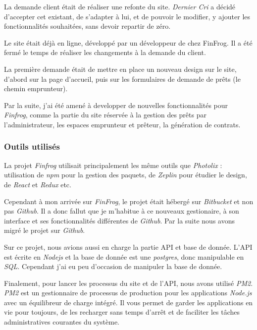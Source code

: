 \documentclass[12pt,a4paper]{article}
\begin{document}
  \bigskip
  La demande client était de réaliser une refonte du site. \emph{Dernier
  Cri} a décidé d'accepter cet existant, de s'adapter à lui, et de pouvoir
  le modifier, y ajouter les fonctionnalités souhaitées, sans devoir
  repartir de zéro.

  \bigskip

  Le site était déjà en ligne, développé par un développeur de chez
  FinFrog. Il a été fermé le temps de réaliser les changements à la
  demande du client.

  \bigskip

  La première demande était de mettre en place un nouveau design sur le
  site, d'abord sur la page d'accueil, puis sur les formulaires de demande
  de prêts (le chemin emprunteur).

  \bigskip

  Par la suite, j'ai été amené à developper de nouvelles fonctionnalités
  pour \emph{Finfrog}, comme la partie du site réservée à la gestion des
  prêts par l'administrateur, les espaces emprunteur et prêteur, la
  génération de contrats.

  \bigskip

  \subsubsection{Outils utilisés}\label{outils-utilisuxe9s-1}

  \bigskip

  La projet \emph{Finfrog} utilisait principalement les même outils que
  \emph{Photolix} : utilisation de \emph{npm} pour la gestion des paquets,
  de \emph{Zeplin} pour étudier le design, de \emph{React} et \emph{Redux}
  etc.

  \bigskip

  Cependant à mon arrivée sur \emph{FinFrog}, le projet était hébergé sur
  \emph{Bitbucket} et non pas \emph{Github}. Il a donc fallut que je
  m'habitue à ce nouveaux gestionaire, à son interface et ses
  fonctionnalités différentes de \emph{Github}. Par la suite nous avons
  migré le projet sur \emph{Github}.

  \bigskip

  Sur ce projet, nous avions aussi en charge la partie API et base de
  donnée. L'API est écrite en \emph{Nodejs} et la base de donnée est une
  \emph{postgres}, donc manipulable en \emph{SQL}. Cependant j'ai eu peu
  d'occasion de manipuler la base de donnée.

  \bigskip

  Finalement, pour lancer les processus du site et de l'API, nous avons
  utilisé \emph{PM2}. \emph{PM2} est un gestionnaire de processus de
  production pour les applications \emph{Node.js} avec un équilibreur de
  charge intégré. Il vous permet de garder les applications en vie pour
  toujours, de les recharger sans temps d'arrêt et de faciliter les tâches
  administratives courantes du système.
\end{document}
